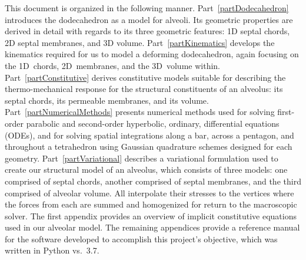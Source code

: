 This document is organized in the following manner.  Part~\ref{partDodecahedron} introduces the dodecahedron as a model for alveoli.  Its geometric properties are derived in detail with regards to its three geometric features: 1D septal chords, 2D septal membranes, and 3D volume.  Part~\ref{partKinematics} develops the kinematics required for us to model a deforming dodecahedron, again focusing on the 1D~chords, 2D~membranes, and the 3D~volume within.  Part~\ref{partConstitutive} derives constitutive models suitable for describing the thermo-mechanical response for the structural constituents of an alveolus: its septal chords, its permeable membranes, and its volume.  Part~\ref{partNumericalMethods} presents numerical methods used for solving first-order parabolic and second-order hyperbolic, ordinary, differential equations (ODEs), and for solving spatial integrations along a bar, across a pentagon, and throughout a tetrahedron using Gaussian quadrature schemes designed for each geometry.  Part~\ref{partVariational} describes a variational formulation used to create our structural model of an alveolus, which consists of three models: one comprised of septal chords, another comprised of septal membranes, and the third comprised of alveolar volume.  All interpolate their stresses to the vertices where the forces from each are summed and homogenized for return to the macroscopic solver.  The first appendix provides an overview of implicit constitutive equations used in our alveolar model.  The remaining appendices provide a reference manual for the software developed to accomplish this project's objective, which was written in Python vs.~3.7.
